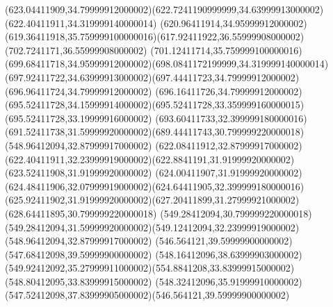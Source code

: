 {{	\curveto(623.04411909,34.79999912000002)(622.7241190999999,34.63999913000002)(622.40411911,34.319999140000014)
	\curveto(620.96411914,34.95999912000002)(619.36411918,35.759999100000016)(617.92411922,36.55999908000002)
	\lineto(702.7241171,36.55999908000002)
	\curveto(701.12411714,35.759999100000016)(699.68411718,34.95999912000002)(698.0841172199999,34.319999140000014)
	\curveto(697.92411722,34.63999913000002)(697.44411723,34.79999912000002)(696.96411724,34.79999912000002)
	\curveto(696.16411726,34.79999912000002)(695.52411728,34.15999914000002)(695.52411728,33.359999160000015)
	\lineto(695.52411728,33.19999916000002)
	\curveto(693.60411733,32.399999180000016)(691.52411738,31.59999920000002)(689.44411743,30.799999220000018)
	\closepath
	\moveto(548.96412094,32.87999917000002)
	\lineto(622.08411912,32.87999917000002)
	\curveto(622.40411911,32.23999919000002)(622.8841191,31.91999920000002)(623.52411908,31.91999920000002)
	\curveto(624.00411907,31.91999920000002)(624.48411906,32.07999919000002)(624.64411905,32.399999180000016)
	\curveto(625.92411902,31.91999920000002)(627.20411899,31.27999921000002)(628.64411895,30.799999220000018)
	\lineto(549.28412094,30.799999220000018)
	\curveto(549.28412094,31.59999920000002)(549.12412094,32.23999919000002)(548.96412094,32.87999917000002)
	\closepath
	\moveto(546.564121,39.59999900000002)
	\lineto(547.68412098,39.59999900000002)
	\curveto(548.16412096,38.63999903000002)(549.92412092,35.27999911000002)(554.8841208,33.83999915000002)
	\lineto(548.80412095,33.83999915000002)
	\curveto(548.32412096,35.91999910000002)(547.52412098,37.83999905000002)(546.564121,39.59999900000002)
	\closepath
}
}

